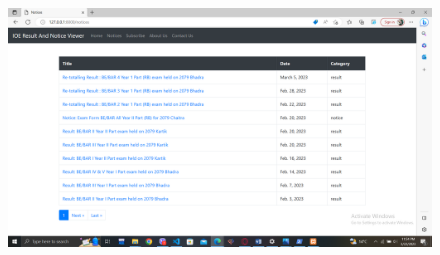 \begin{figure}[h]
    \centering
    \includegraphics[scale=0.2]{pictures/8.png}
\end{figure}







	

